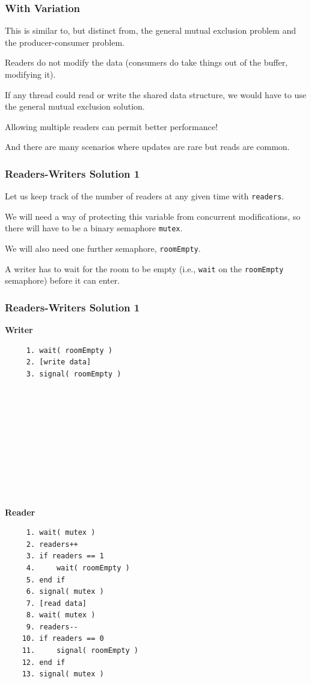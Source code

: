 \begin{frame}
	\frametitle{With Variation}

	This is similar to, but distinct from, the general mutual exclusion problem and the producer-consumer problem.

	Readers do not modify the data (consumers do take things out of the buffer, modifying it).

	If any thread could read or write the shared data structure, we would have to use the general mutual exclusion solution.

	Allowing multiple readers can permit better performance!

	And there are many scenarios where updates are rare but reads are common.

\end{frame}

\begin{frame}
	\frametitle{Readers-Writers Solution 1}
	Let us keep track of the number of readers at any given time with \texttt{readers}.

	We will need a way of protecting this variable from concurrent modifications, so there will have to be a binary semaphore \texttt{mutex}.

	We will also need one further semaphore, \texttt{roomEmpty}.

	A writer has to wait for the room to be empty (i.e., \texttt{wait} on the \texttt{roomEmpty} semaphore) before it can enter.
\end{frame}



\begin{frame}[fragile]
	\frametitle{Readers-Writers Solution 1}

	\begin{multicols}{2}
		\textbf{Writer}
		\begin{verbatim}
	 1. wait( roomEmpty )
	 2. [write data]
	 3. signal( roomEmpty )
	 
	 
	 
	 
	 
	 
	 
	 
	 
	 
  \end{verbatim}
		\columnbreak
		\textbf{Reader}
		\begin{verbatim}
	 1. wait( mutex )
	 2. readers++
	 3. if readers == 1
	 4.     wait( roomEmpty )
	 5. end if
	 6. signal( mutex )
	 7. [read data]
	 8. wait( mutex )
	 9. readers--
	10. if readers == 0
	11.     signal( roomEmpty )
	12. end if
	13. signal( mutex )
  \end{verbatim}
	\end{multicols}
	\vspace{-2em}

\end{frame}

